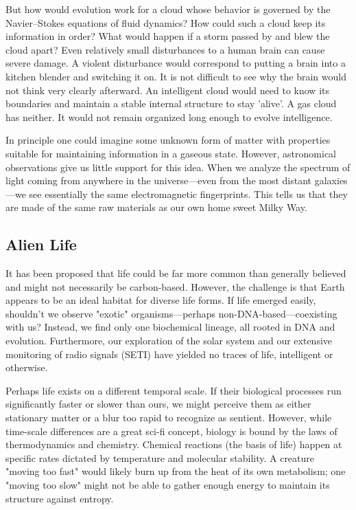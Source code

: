 But how would evolution work for a cloud whose behavior is governed
by the Navier--Stokes equations of fluid dynamics? How could such a
cloud keep its information in order? What would happen if a storm
passed by and blew the cloud apart? Even relatively small disturbances to a human brain can cause severe
damage. A violent disturbance would correspond to putting a brain into
a kitchen blender and switching it on. It is not difficult to see why
the brain would not think very clearly afterward.
An intelligent cloud would need to know its boundaries and maintain
a stable internal structure to stay 'alive'. A gas cloud has neither. It would not
remain organized long enough to evolve intelligence.

In principle one could imagine some unknown form of matter with
properties suitable for maintaining information in a gaseous state.
However, astronomical observations give us little support for this
idea. When we analyze the spectrum of light coming from anywhere in
the universe—even from the most distant galaxies—we see essentially
the same electromagnetic fingerprints. This tells us that they are
made of the same raw materials as our own home sweet Milky Way.



\subsection*{Alien Life}

It has been proposed that life could be far more common than generally believed and might not necessarily be carbon-based.
However, the challenge is that Earth appears to be an ideal habitat for diverse life forms.
If life emerged easily, shouldn't we observe "exotic" organisms—perhaps non-DNA-based—coexisting with us? Instead, we find only one biochemical lineage, all rooted in DNA and evolution.
Furthermore, our exploration of the solar system and our extensive monitoring of radio signals (SETI) have yielded no traces of life, intelligent or otherwise.

Perhaps life exists on a different temporal scale. If their biological processes run significantly faster or slower than ours, we might perceive them as either stationary matter or a blur too rapid to recognize as sentient.
However, while time-scale differences are a great sci-fi concept, biology is bound by the laws of thermodynamics and chemistry.
Chemical reactions (the basis of life) happen at specific rates dictated by temperature and molecular stability.
A creature "moving too fast" would likely burn up from the heat of its own metabolism; one "moving too slow" might not be able to gather enough energy to maintain its structure against entropy.


